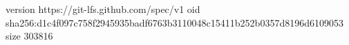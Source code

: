 version https://git-lfs.github.com/spec/v1
oid sha256:d1c4f097c758f2945935badf6763b3110048c15411b252b0357d8196d6109053
size 303816
